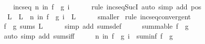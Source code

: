 \begin{isabellebody}
\ \ \isamarkupfalse%
\ {\isachardoublequoteopen}incseq\ {\isacharparenleft}{\kern0pt}{\isasymlambda}n{\isachardot}{\kern0pt}\ {\isasymSum}i{\isacharless}{\kern0pt}n{\isachardot}{\kern0pt}\ {\isacharparenleft}{\kern0pt}f\ {\isasymcirc}\ g{\isacharparenright}{\kern0pt}\ i{\isacharparenright}{\kern0pt}{\isachardoublequoteclose}\isanewline
\ \ \ \ \isamarkupfalse%
\ {\isacharparenleft}{\kern0pt}rule\ incseq{\isacharunderscore}{\kern0pt}SucI{\isacharparenright}{\kern0pt}\ {\isacharparenleft}{\kern0pt}auto\ simp\ add{\isacharcolon}{\kern0pt}\ pos{\isacharparenright}{\kern0pt}\isanewline
\ \ \isamarkupfalse%
\ \isamarkupfalse%
\ \ L\ \ L{\isacharcolon}{\kern0pt}\ {\isachardoublequoteopen}{\isacharparenleft}{\kern0pt}{\isasymlambda}\ n{\isachardot}{\kern0pt}\ {\isasymSum}i{\isacharless}{\kern0pt}n{\isachardot}{\kern0pt}\ {\isacharparenleft}{\kern0pt}f\ {\isasymcirc}\ g{\isacharparenright}{\kern0pt}\ i{\isacharparenright}{\kern0pt}\ {\isasymlonglonglongrightarrow}\ L{\isachardoublequoteclose}\isanewline
\ \ \ \ \isamarkupfalse%
\ smaller\ \isamarkupfalse%
{\isacharparenleft}{\kern0pt}rule\ incseq{\isacharunderscore}{\kern0pt}convergent{\isacharparenright}{\kern0pt}\isanewline
\ \ \isamarkupfalse%
\ \isamarkupfalse%
\ {\isachardoublequoteopen}{\isacharparenleft}{\kern0pt}f\ {\isasymcirc}\ g{\isacharparenright}{\kern0pt}\ sums\ L{\isachardoublequoteclose}\isanewline
\ \ \ \ \isamarkupfalse%
\ {\isacharparenleft}{\kern0pt}simp\ add{\isacharcolon}{\kern0pt}\ sums{\isacharunderscore}{\kern0pt}def{\isacharparenright}{\kern0pt}\isanewline
\ \ \isamarkupfalse%
\ \isamarkupfalse%
\ {\isachardoublequoteopen}summable\ {\isacharparenleft}{\kern0pt}f\ {\isasymcirc}\ g{\isacharparenright}{\kern0pt}{\isachardoublequoteclose}\isanewline
\ \ \ \ \isamarkupfalse%
\ {\isacharparenleft}{\kern0pt}auto\ simp\ add{\isacharcolon}{\kern0pt}\ sums{\isacharunderscore}{\kern0pt}iff{\isacharparenright}{\kern0pt}\isanewline
\isanewline
\ \ \isamarkupfalse%
\ \isamarkupfalse%
\ {\isachardoublequoteopen}{\isacharparenleft}{\kern0pt}{\isasymlambda}n{\isachardot}{\kern0pt}\ {\isasymSum}i{\isacharless}{\kern0pt}n{\isachardot}{\kern0pt}\ {\isacharparenleft}{\kern0pt}f\ {\isasymcirc}\ g{\isacharparenright}{\kern0pt}\ i{\isacharparenright}{\kern0pt}\ {\isasymlonglonglongrightarrow}\ suminf\ {\isacharparenleft}{\kern0pt}f\ {\isasymcirc}\ g{\isacharparenright}{\kern0pt}{\isachardoublequoteclose}\isanewline

\end{isabellebody}
